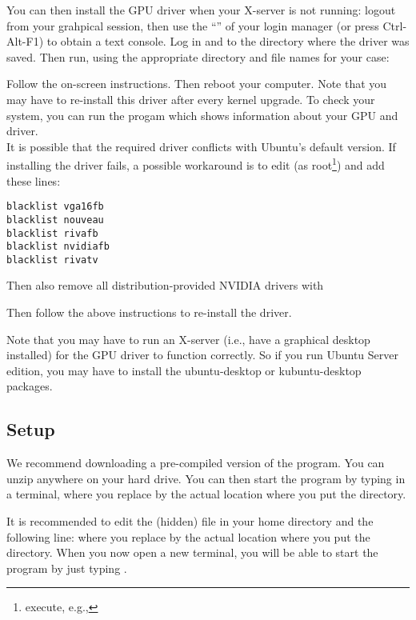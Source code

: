 You can then install the GPU driver when your X-server is not running: logout from your grahpical session, then use the ``'' of your login manager (or press Ctrl-Alt-F1) to obtain a text console. Log in and  to the directory where the driver was saved. Then run, using the appropriate directory and file names for your case:


Follow the on-screen instructions. Then reboot your computer. Note that you may have to re-install this driver after every kernel upgrade. To check your system, you can run the progam  which shows information about your GPU and driver.\\

It is possible that the required driver conflicts with Ubuntu's default version. If installing the driver fails, a possible workaround is to edit  (as root\footnote{execute, e.g., }) and add these lines:
\small
\begin{verbatim}
blacklist vga16fb
blacklist nouveau
blacklist rivafb
blacklist nvidiafb
blacklist rivatv
\end{verbatim}
\normalsize

Then also remove all distribution-provided \textsc{NVIDIA} drivers with


Then follow the above instructions to re-install the driver.

Note that you may have to run an X-server (i.e., have a graphical desktop installed) for the GPU driver to function correctly. So if you run Ubuntu Server edition, you may have to install the ubuntu-desktop or kubuntu-desktop packages.

\subsection{Setup}

We recommend downloading a pre-compiled version of the program. You can unzip  anywhere on your hard drive. You can then start the program by typing  in a terminal, where you replace  by the actual location where you put the \prog directory.


It is recommended to edit the (hidden)  file in your home directory and the following line:  where you replace  by the actual location where you put the \prog directory. When you now open a new terminal, you will be able to start the program by just typing \prog.


